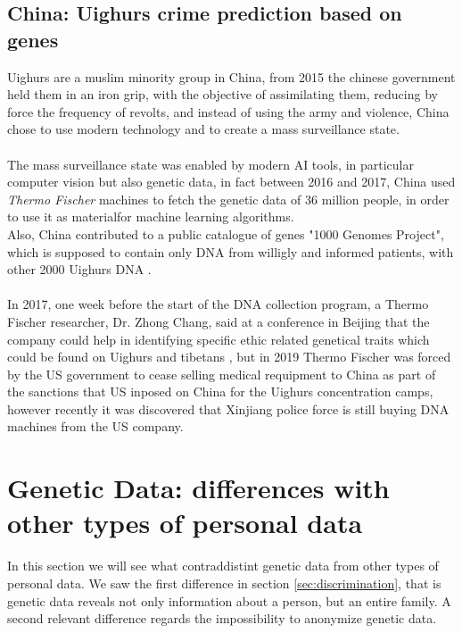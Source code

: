 \documentclass[12pt]{article}
\begin{document}
\subsection{China: Uighurs crime prediction based on genes}
Uighurs are a muslim minority group in China, from 2015 the chinese government held them in an iron grip, with the objective of assimilating them, 
reducing by force the frequency of revolts, and instead of using the army and violence, China chose to use modern technology and to create a mass surveillance state. \cite{china_fischer}\\
\\
The mass surveillance state was enabled by modern AI tools, in particular computer vision but also genetic data, in fact between 2016 and 2017, China used \emph{Thermo Fischer} machines 
to fetch the genetic data of 36 million people, in order to use it as materialfor machine learning algorithms. \\
Also, China contributed to a public catalogue of genes "1000 Genomes Project", which is supposed to contain only DNA from willigly and informed patients, with other 2000 Uighurs DNA \cite{china_fischer}.\\
\\
In 2017, one week before the start of the DNA collection program, a Thermo Fischer researcher, Dr. Zhong Chang, 
said at a conference in Beijing that the company could help in identifying specific ethic related genetical traits which could be found on Uighurs and tibetans \cite{china_collect_dna}, but in 
2019 Thermo Fischer was forced by the US government to cease selling medical requipment to China as part of the sanctions that US inposed on China for the Uighurs concentration camps, however recently it was discovered that Xinjiang police force is still buying DNA machines from the US company. \cite{china_uighurs}\\


\newpage
\section{Genetic Data: differences with other types of personal data}
\label{sec:anonymous}
In this section we will see what contraddistint genetic data from other types of personal data. We saw the first difference in section \ref{sec:discrimination}, that is 
genetic data reveals not only information about a person, but an entire family. A second relevant difference regards the impossibility to anonymize genetic data. \cite{anonymization}
\end{document}
